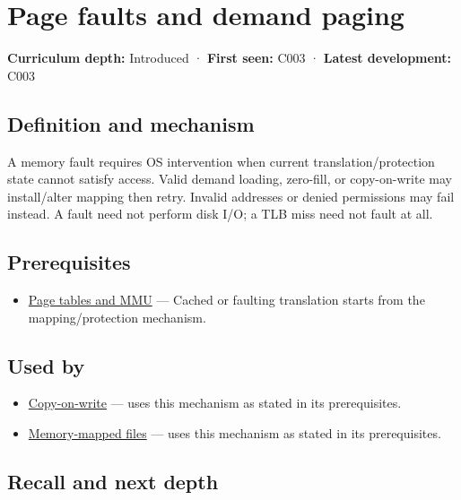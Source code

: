 \hypertarget{appendix-cc0909a7ef14}{}
\section{Page faults and demand paging}\label{appendix-cc0909a7ef14-page-faults-and-demand-paging}

\textbf{Curriculum depth:} Introduced · \textbf{First seen:} C003 · \textbf{Latest development:} C003

\subsection{Definition and mechanism}\label{appendix-cc0909a7ef14-definition-and-mechanism}

A memory fault requires OS intervention when current translation/protection state cannot satisfy access. Valid demand loading, zero-fill, or copy-on-write may install/alter mapping then retry. Invalid addresses or denied permissions may fail instead. A fault need not perform disk I/O; a TLB miss need not fault at all.

\subsection{Prerequisites}\label{appendix-cc0909a7ef14-prerequisites}

\begin{itemize}
\tightlist
\item
  \hyperref[appendix-01e5905165c4]{Page tables and MMU} --- Cached or faulting translation starts from the mapping/protection mechanism.
\end{itemize}

\subsection{Used by}\label{appendix-cc0909a7ef14-used-by}

\begin{itemize}
\tightlist
\item
  \hyperref[appendix-7a06e5baac04]{Copy-on-write} --- uses this mechanism as stated in its prerequisites.
\item
  \hyperref[appendix-313ee7a0ba7b]{Memory-mapped files} --- uses this mechanism as stated in its prerequisites.
\end{itemize}

\subsection{Recall and next depth}\label{appendix-cc0909a7ef14-recall-and-next-depth}

